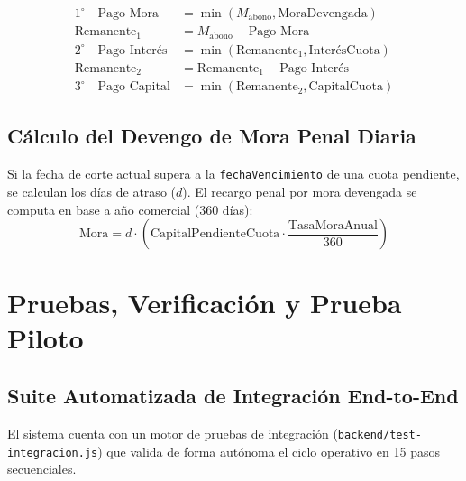 \documentclass[11pt,letterpaper]{report}
\begin{document}
\begin{equation}
\begin{aligned}
1^\circ \quad \text{Pago Mora} &= \min(M_{\text{abono}}, \text{MoraDevengada}) \\
\text{Remanente}_1 &= M_{\text{abono}} - \text{Pago Mora} \\
2^\circ \quad \text{Pago Interés} &= \min(\text{Remanente}_1, \text{InterésCuota}) \\
\text{Remanente}_2 &= \text{Remanente}_1 - \text{Pago Interés} \\
3^\circ \quad \text{Pago Capital} &= \min(\text{Remanente}_2, \text{CapitalCuota})
\end{aligned}
\end{equation}

\section{Cálculo del Devengo de Mora Penal Diaria}
Si la fecha de corte actual supera a la \texttt{fechaVencimiento} de una cuota pendiente, se calculan los días de atraso ($d$). El recargo penal por mora devengada se computa en base a año comercial (360 días):
\begin{equation}
\text{Mora} = d \cdot \left( \text{CapitalPendienteCuota} \cdot \frac{\text{TasaMoraAnual}}{360} \right)
\end{equation}

\chapter{Pruebas, Verificación y Prueba Piloto}

\section{Suite Automatizada de Integración End-to-End}
El sistema cuenta con un motor de pruebas de integración (\texttt{backend/test-integracion.js}) que valida de forma autónoma el ciclo operativo en 15 pasos secuenciales.
\end{document}

